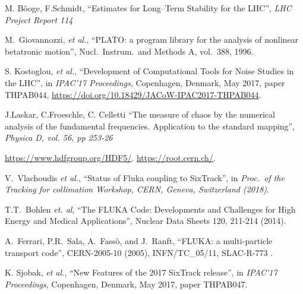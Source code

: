 \documentclass[a4paper,
              ]{jacow}
\begin{document}
\begin{thebibliography}{99}
{M. B\"ooge}, {F.Schmidt}, ``{Estimates for Long–Term Stability for the LHC}'', \emph{LHC Project Report 114}

M.\ Giovannozzi, {\it et al.},
``PLATO: a program library for the analysis of nonlinear betatronic motion'',  
Nucl.\ Instrum.\ and Methods A, vol.\ 388, 1996.

   S. Kostoglou, {\it et al.},
   ``Development of Computational Tools for Noise Studies in the LHC'',
   in \emph{IPAC'17 Proceedings}, Copenhagen, Denmark, May 2017, paper THPAB044,
   \url{https://doi.org/10.18429/JACoW-IPAC2017-THPAB044}.

{J.Laskar}, {C.Froeschle}, {C. Celletti} ``{The measure of chaos by the numerical analysis of the fundamental frequencies. Application to the standard mapping}'', \emph{Physica D, vol. 56, pp 253-26}

 \url{https://www.hdfgroup.org/HDF5/}.
 \url{https://root.cern.ch/}.


V.~Vlachoudis \emph{et al.}, ``Status of Fluka coupling to SixTrack'',
 in \emph{Proc.~of the Tracking for collimation Workshop, CERN, Geneva, Switzerland (2018)}.
 

T.T.~Bohlen \emph{et. al}, ``The FLUKA Code: Developments and Challenges for High Energy and Medical Applications'',
Nuclear Data Sheets 120, 211-214 (2014).
 
A.~Ferrari, P.R.~Sala, A.~Fass\`o, and J.~Ranft,
``FLUKA: a multi-particle transport code'',
CERN-2005-10 (2005), INFN/TC\_05/11, SLAC-R-773 .

K. Sjobak, {\it et al.},
``New Features of the 2017 SixTrack release'',
in \textit{IPAC'17 Proceedings}, Copenhagen, Denmark, May 2017, paper THPAB047.





\end{thebibliography}
\end{document}
